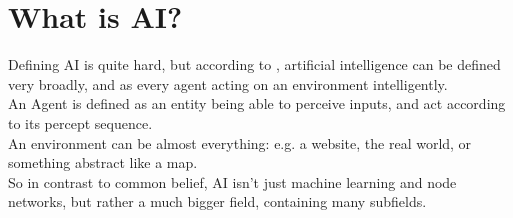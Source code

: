 \chapter{What is AI?}

Defining AI is quite hard, but according to \cite{russellArtificialIntelligenceModern2010}, artificial intelligence can be defined very broadly, and as every agent acting on an environment intelligently.\\An Agent is defined as an entity being able to perceive inputs, and act according to its percept sequence.\\ An environment can be almost everything: e.g. a website, the real world, or something abstract like a map.\\ So in contrast to common belief, AI isn't just machine learning and node networks, but rather a much bigger field, containing many subfields.